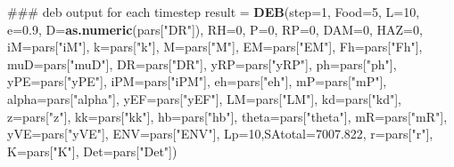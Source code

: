 \documentclass[10,portrait]{article}
\newenvironment{Shaded}{\begin{snugshade}}{\end{snugshade}}
\newcommand{\KeywordTok}[1]{\textcolor[rgb]{0.13,0.29,0.53}{\textbf{#1}}}
\newcommand{\DataTypeTok}[1]{\textcolor[rgb]{0.13,0.29,0.53}{#1}}
\newcommand{\DecValTok}[1]{\textcolor[rgb]{0.00,0.00,0.81}{#1}}
\newcommand{\FloatTok}[1]{\textcolor[rgb]{0.00,0.00,0.81}{#1}}
\newcommand{\StringTok}[1]{\textcolor[rgb]{0.31,0.60,0.02}{#1}}
\newcommand{\NormalTok}[1]{#1}
\begin{document}
\begin{Shaded}
\begin{Highlighting}[]
{{\NormalTok{### deb output for each timestep }
\NormalTok{result =}\StringTok{ }\KeywordTok{DEB}\NormalTok{(}\DataTypeTok{step=}\DecValTok{1}\NormalTok{, }\DataTypeTok{Food=}\DecValTok{5}\NormalTok{, }\DataTypeTok{L=}\DecValTok{10}\NormalTok{, }\DataTypeTok{e=}\FloatTok{0.9}\NormalTok{, }\DataTypeTok{D=}\KeywordTok{as.numeric}\NormalTok{(pars[}\StringTok{"DR"}\NormalTok{]), }\DataTypeTok{RH=}\DecValTok{0}\NormalTok{, }\DataTypeTok{P=}\DecValTok{0}\NormalTok{, }\DataTypeTok{RP=}\DecValTok{0}\NormalTok{, }\DataTypeTok{DAM=}\DecValTok{0}\NormalTok{, }\DataTypeTok{HAZ=}\DecValTok{0}\NormalTok{, }\DataTypeTok{iM=}\NormalTok{pars[}\StringTok{"iM"}\NormalTok{], }\DataTypeTok{k=}\NormalTok{pars[}\StringTok{"k"}\NormalTok{], }\DataTypeTok{M=}\NormalTok{pars[}\StringTok{"M"}\NormalTok{], }\DataTypeTok{EM=}\NormalTok{pars[}\StringTok{"EM"}\NormalTok{], }
             \DataTypeTok{Fh=}\NormalTok{pars[}\StringTok{"Fh"}\NormalTok{], }\DataTypeTok{muD=}\NormalTok{pars[}\StringTok{"muD"}\NormalTok{], }\DataTypeTok{DR=}\NormalTok{pars[}\StringTok{"DR"}\NormalTok{], }\DataTypeTok{yRP=}\NormalTok{pars[}\StringTok{"yRP"}\NormalTok{], }\DataTypeTok{ph=}\NormalTok{pars[}\StringTok{"ph"}\NormalTok{], }\DataTypeTok{yPE=}\NormalTok{pars[}\StringTok{"yPE"}\NormalTok{], }\DataTypeTok{iPM=}\NormalTok{pars[}\StringTok{"iPM"}\NormalTok{], }\DataTypeTok{eh=}\NormalTok{pars[}\StringTok{"eh"}\NormalTok{],}
             \DataTypeTok{mP=}\NormalTok{pars[}\StringTok{"mP"}\NormalTok{], }\DataTypeTok{alpha=}\NormalTok{pars[}\StringTok{"alpha"}\NormalTok{], }\DataTypeTok{yEF=}\NormalTok{pars[}\StringTok{"yEF"}\NormalTok{], }\DataTypeTok{LM=}\NormalTok{pars[}\StringTok{"LM"}\NormalTok{], }\DataTypeTok{kd=}\NormalTok{pars[}\StringTok{"kd"}\NormalTok{], }\DataTypeTok{z=}\NormalTok{pars[}\StringTok{"z"}\NormalTok{], }\DataTypeTok{kk=}\NormalTok{pars[}\StringTok{"kk"}\NormalTok{], }\DataTypeTok{hb=}\NormalTok{pars[}\StringTok{"hb"}\NormalTok{],}
             \DataTypeTok{theta=}\NormalTok{pars[}\StringTok{"theta"}\NormalTok{], }\DataTypeTok{mR=}\NormalTok{pars[}\StringTok{"mR"}\NormalTok{], }\DataTypeTok{yVE=}\NormalTok{pars[}\StringTok{"yVE"}\NormalTok{], }\DataTypeTok{ENV=}\NormalTok{pars[}\StringTok{"ENV"}\NormalTok{], }\DataTypeTok{Lp=}\DecValTok{10}\NormalTok{,}\DataTypeTok{SAtotal=}\FloatTok{7007.822}\NormalTok{, }\DataTypeTok{r=}\NormalTok{pars[}\StringTok{"r"}\NormalTok{], }\DataTypeTok{K=}\NormalTok{pars[}\StringTok{"K"}\NormalTok{], }\DataTypeTok{Det=}\NormalTok{pars[}\StringTok{"Det"}\NormalTok{]) }

}}
\end{Highlighting}
\end{Shaded}
\end{document}
